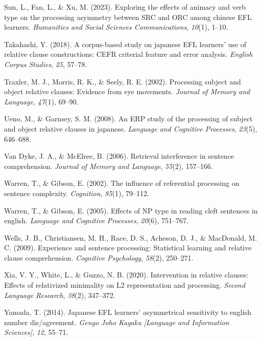 \documentclass[
]{article}
\newlength{\cslhangindent}
\newenvironment{CSLReferences}[2] %
 {\begin{list}{}{%
  \setlength{\itemindent}{0pt}
  \setlength{\leftmargin}{0pt}
  \setlength{\parsep}{0pt}
  \ifodd #1
   \setlength{\leftmargin}{\cslhangindent}
   \setlength{\itemindent}{-1\cslhangindent}
  \fi
  \setlength{\itemsep}{#2\baselineskip}}}
 {\end{list}}
\begin{document}
\begin{CSLReferences}{1}{0}
Sun, L., Fan, L., \& Xu, M. (2023). Exploring the effects of animacy and
verb type on the processing asymmetry between SRC and ORC among chinese
EFL learners. \emph{Humanities and Social Sciences Communications},
\emph{10}(1), 1--10.

Takahashi, Y. (2018). A corpus-based study on japanese EFL learners' use
of relative clause constructions: CEFR criterial feature and error
analysis. \emph{English Corpus Studies}, \emph{25}, 57--78.

Traxler, M. J., Morris, R. K., \& Seely, R. E. (2002). Processing
subject and object relative clauses: Evidence from eye movements.
\emph{Journal of Memory and Language}, \emph{47}(1), 69--90.

Ueno, M., \& Garnsey, S. M. (2008). An ERP study of the processing of
subject and object relative clauses in japanese. \emph{Language and
Cognitive Processes}, \emph{23}(5), 646--688.

Van Dyke, J. A., \& McElree, B. (2006). Retrieval interference in
sentence comprehension. \emph{Journal of Memory and Language},
\emph{55}(2), 157--166.

Warren, T., \& Gibson, E. (2002). The influence of referential
processing on sentence complexity. \emph{Cognition}, \emph{85}(1),
79--112.

Warren, T., \& Gibson, E. (2005). Effects of NP type in reading cleft
sentences in english. \emph{Language and Cognitive Processes},
\emph{20}(6), 751--767.

Wells, J. B., Christiansen, M. H., Race, D. S., Acheson, D. J., \&
MacDonald, M. C. (2009). Experience and sentence processing: Statistical
learning and relative clause comprehension. \emph{Cognitive Psychology},
\emph{58}(2), 250--271.

Xia, V. Y., White, L., \& Guzzo, N. B. (2020). Intervention in relative
clauses: Effects of relativized minimality on L2 representation and
processing. \emph{Second Language Research}, \emph{38}(2), 347--372.

Yamada, T. (2014). Japanese EFL learners' asymmetrical sensitivity to
english number dis/agreement. \emph{Gengo Joho Kagaku {[}Language and
Information Sciences{]}}, \emph{12}, 55--71.


\end{CSLReferences}
\end{document}
